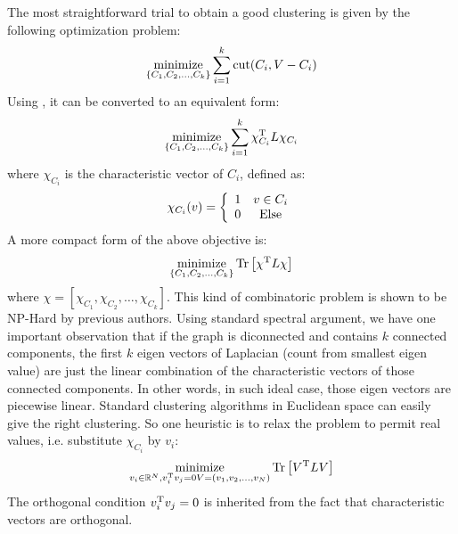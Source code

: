 The most straightforward trial to obtain a good clustering is 
given by the following optimization problem:
\begin{equation}
	\operatorname*{minimize}_{\{C_1, C_2, \ldots, C_k\}}{ \sum_{i=1}^{k}{\text{cut}(C_i, V-C_i)} }
	\label{eq:cut_def}
\end{equation}
Using \req{\ref{eq:lap_psd}}, it can be converted to an equivalent form:
\begin{equation}
	\operatorname*{minimize}_{\{C_1, C_2, \ldots, C_k\}}{ \sum_{i=1}^{k}
	{ \chi_{C_i}^\mathrm{T} L \chi_{C_i} } }
\end{equation}
where $ \chi_{C_i} $ is the characteristic vector of $ C_i $, defined as:
\begin{equation}
	\chi_{C_i}(v)= \left\lbrace
	\begin{array}{c c}
		1 &  v \in C_i \\
		0 &  \text{Else} 
	\end{array}\right.
\end{equation}
A more compact form of the above objective is:
\begin{equation}
	\operatorname*{minimize}_{\{C_1, C_2, \ldots, C_k\}}{ \mathrm{Tr}\left[ \chi^\mathrm{T} L \chi \right] }
\end{equation}
where $ \chi = [\chi_{C_1}, \chi_{C_2}, \ldots , \chi_{C_k}] $. 
This kind of combinatoric problem is shown to be NP-Hard by previous authors. 
Using standard spectral argument\cite{von2007tutorial}, 
we have one important observation that if the graph is diconnected 
and contains $ k $ connected components, the first $ k $ eigen vectors 
of Laplacian (count from smallest eigen value) are just the linear 
combination of the characteristic vectors of those connected components. 
In other words, in such ideal case, those eigen vectors are piecewise linear. 
Standard clustering algorithms in Euclidean space can easily 
give the right clustering. So one heuristic is to relax the problem 
to permit real values, i.e. substitute $ \chi_{C_i} $ by $ v_i $:
\begin{equation}
	\operatorname*{minimize}_{v_i \in \mathbb{R}^N, v_i^\mathrm{T}v_j = 0 V=(v_1,v_2, \ldots , v_N) }
	{ \mathrm{Tr}\left[ V^\mathrm{T} L V \right] }
	\label{eq:cut_relax}
\end{equation} 
The orthogonal condition $ v_i^\mathrm{T}v_j = 0 $ is inherited from 
the fact that characteristic vectors are orthogonal. 

